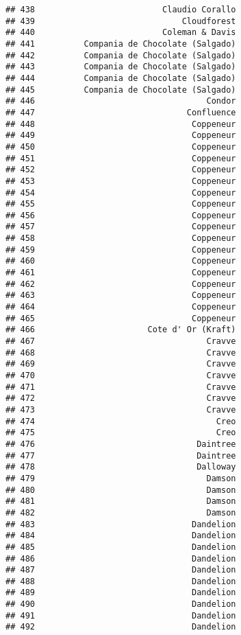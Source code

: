 \documentclass[
]{article}
\begin{document}
\begin{verbatim}
## 438                          Claudio Corallo
## 439                              Cloudforest
## 440                          Coleman & Davis
## 441          Compania de Chocolate (Salgado)
## 442          Compania de Chocolate (Salgado)
## 443          Compania de Chocolate (Salgado)
## 444          Compania de Chocolate (Salgado)
## 445          Compania de Chocolate (Salgado)
## 446                                   Condor
## 447                               Confluence
## 448                                Coppeneur
## 449                                Coppeneur
## 450                                Coppeneur
## 451                                Coppeneur
## 452                                Coppeneur
## 453                                Coppeneur
## 454                                Coppeneur
## 455                                Coppeneur
## 456                                Coppeneur
## 457                                Coppeneur
## 458                                Coppeneur
## 459                                Coppeneur
## 460                                Coppeneur
## 461                                Coppeneur
## 462                                Coppeneur
## 463                                Coppeneur
## 464                                Coppeneur
## 465                                Coppeneur
## 466                       Cote d' Or (Kraft)
## 467                                   Cravve
## 468                                   Cravve
## 469                                   Cravve
## 470                                   Cravve
## 471                                   Cravve
## 472                                   Cravve
## 473                                   Cravve
## 474                                     Creo
## 475                                     Creo
## 476                                 Daintree
## 477                                 Daintree
## 478                                 Dalloway
## 479                                   Damson
## 480                                   Damson
## 481                                   Damson
## 482                                   Damson
## 483                                Dandelion
## 484                                Dandelion
## 485                                Dandelion
## 486                                Dandelion
## 487                                Dandelion
## 488                                Dandelion
## 489                                Dandelion
## 490                                Dandelion
## 491                                Dandelion
## 492                                Dandelion

\end{verbatim}
\end{document}

